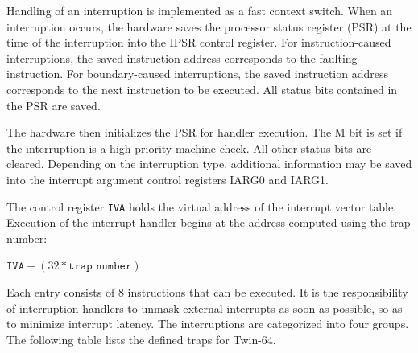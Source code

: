 Handling of an interruption is implemented as a fast context switch. When an interruption occurs, the hardware saves the processor status register (PSR) at the time of the interruption into the IPSR control register. For instruction-caused interruptions, the saved instruction address corresponds to the faulting instruction. For boundary-caused interruptions, the saved instruction address corresponds to the next instruction to be executed. All status bits contained in the PSR are saved.

The hardware then initializes the PSR for handler execution. The M bit is set if the interruption is a high-priority machine check. All other status bits are cleared. Depending on the interruption type, additional information may be saved into the interrupt argument control registers IARG0 and IARG1.


The control register \texttt{IVA} holds the virtual address of the interrupt vector table. Execution of the interrupt handler begins at the address computed using the trap number:

\begin{flushleft}
\hspace*{2em}%
\(
\texttt{IVA} + ( 32 * \texttt{trap number} )
\)
\end{flushleft}

Each entry consists of 8 instructions that can be executed. It is the responsibility of interruption handlers to unmask external interrupts as soon as possible, so as to minimize interrupt latency. The interruptions are categorized into four groups. The following table lists the defined traps for Twin-64.

